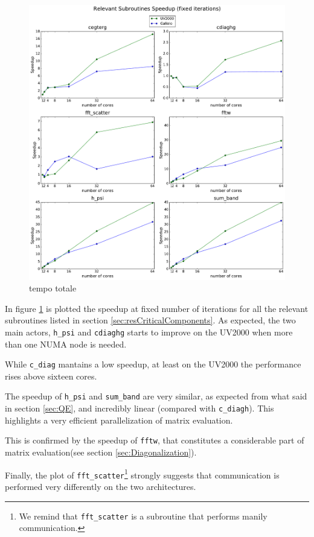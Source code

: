 \documentclass[a4paper,12pt]{article}
\begin{document}
\begin{figure}[hhh!]
\centerline{ \includegraphics[width=1.2\linewidth]{arch_subroutines.pdf}	}
	\caption{tempo totale}
	\label{fig:archSubroutines}
\end{figure}


In figure \ref{fig:archSubroutines} is plotted the speedup at fixed number of iterations for all the relevant subroutines listed in section \ref{sec:resCriticalComponents}.
As expected, the two main actors, \texttt{h\_psi} and \texttt{cdiaghg} starts to improve on the UV2000 when more than one NUMA node is needed.

While \texttt{c\_diag} mantains a low speedup, at least on the UV2000 the performance rises above sixteen cores.

The speedup of \texttt{h\_psi} and \texttt{sum\_band} are very similar, as expected from what said in section \ref{sec:QE}, and incredibly linear (compared with \texttt{c\_diagh}). 
This highlights a very efficient parallelization of matrix evaluation.

This is confirmed by the speedup of \texttt{fftw}, that constitutes a considerable part of matrix evaluation(see section \ref{sec:Diagonalization}).

Finally, the plot of \texttt{fft\_scatter}\footnote{We remind that \texttt{fft\_scatter} is a subroutine that performs manily communication.} strongly suggests that communication is performed very differently on the two architectures.
\end{document}
